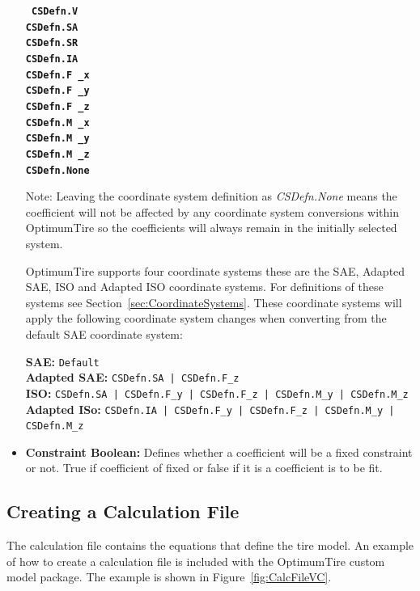 \begin{itemize}
\begin{center}

\texttt{\textbf{   	CSDefn.V \\
    CSDefn.SA \\
    CSDefn.SR \\
    CSDefn.IA \\
    CSDefn.F~\_x \\
    CSDefn.F~\_y \\
    CSDefn.F~\_z \\
    CSDefn.M~\_x \\
    CSDefn.M~\_y \\
    CSDefn.M~\_z \\
    CSDefn.None}}
\end{center}

Note: Leaving the coordinate system definition as \textsl{CSDefn.None} means the coefficient will not be affected by any coordinate system conversions within OptimumTire so the coefficients will always remain in the initially selected system.

OptimumTire supports four coordinate systems these are the SAE, Adapted SAE, ISO and Adapted ISO coordinate systems. For definitions of these systems see Section~\ref{sec:CoordinateSystems}. These coordinate systems will apply the following coordinate system changes when converting from the default SAE coordinate system:

        \textbf{SAE:} {\tt Default} \\
        \textbf{Adapted SAE:}  {\tt CSDefn.SA | CSDefn.F\_z} \\
        \textbf{ISO:} {\tt CSDefn.SA | CSDefn.F\_y | CSDefn.F\_z | CSDefn.M\_y | CSDefn.M\_z} \\
        \textbf{Adapted ISo:} {\tt CSDefn.IA | CSDefn.F\_y | CSDefn.F\_z | CSDefn.M\_y | CSDefn.M\_z}

\item \textbf{Constraint Boolean:} Defines whether a coefficient will be a fixed constraint or not. True if coefficient of fixed or false if it is a coefficient is to be fit.
\end{itemize}

\subsection{Creating a Calculation File}
\label{sec:CreatingaCalculationFile}

The calculation file contains the equations that define the tire model. An example of how to create a calculation file is included with the OptimumTire custom model package. The example is shown in Figure~\ref{fig:CalcFileVC}.

